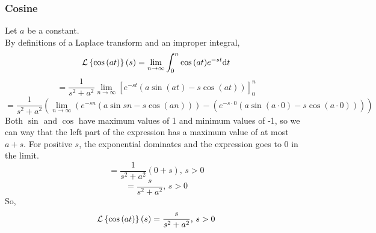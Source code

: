 \subsubsection{Cosine}
\noindent
Let $a$ be a constant.\\
By definitions of a Laplace transform and an improper integral,
\begin{equation*}
\mathcal{L}\left\{ \cos{(at)} \right\}\left(s\right) = \lim\limits_{n\to\infty}{\int_{0}^{n}{\cos{(at)}e^{-st}\mathrm{d}t}}
\end{equation*}
\begin{equation*}
	= \frac{1}{s^2 + a^2}\lim\limits_{n\to\infty}{\left[e^{-st}\left(a\sin{(at)} - s\cos{(at)}\right)\right]_{0}^{n}}
\end{equation*}
\begin{equation*}
	 = \frac{1}{s^2 + a^2}\left(\lim\limits_{n\to\infty}{\left(e^{-sn}\left(a\sin{sn} - s\cos{(an)}\right)\right)} - \left(e^{-s\cdot 0}\left(a\sin{(a\cdot 0)} - s\cos{(a\cdot 0)}\right)\right)\right)
\end{equation*}
Both $\sin$ and $\cos$ have maximum values of 1 and minimum values of -1, so we can way that the left part of the expression has a maximum value of at most $a + s$. For positive $s$, the exponential dominates and the expression goes to 0 in the limit.
\begin{equation*}
	 = \frac{1}{s^2 + a^2}\left(0 + s\right) \text{, } s > 0
\end{equation*}
\begin{equation*}
	 = \frac{s}{s^2 + a^2} \text{, } s > 0
\end{equation*}
So,
\begin{equation*}
	\mathcal{L}\left\{ \cos{(at)} \right\}\left(s\right) = \frac{s}{s^2 + a^2} \text{, } s > 0
\end{equation*}